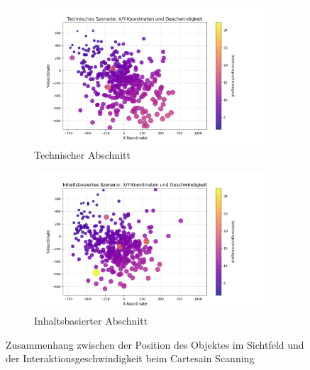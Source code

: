\begin{figure}
    \centering
    \begin{subfigure}{.5\textwidth}
        \centering
        \includegraphics[width=0.95\textwidth]{images/Results/bubbleplot-technisch.png}
        \caption{Technischer Abschnitt}
        \label{fig:bubbleKorrPosGeschwindigkeitTechnisch}
    \end{subfigure}%
    \begin{subfigure}{.5\textwidth}
        \centering
        \includegraphics[width=0.95\textwidth]{images/Results/bubbleplot-inhalt.png}
        \caption{Inhaltsbasierter Abschnitt}
        \label{fig:bubbleKorrPosGeschwindigkeitInhalt}
    \end{subfigure}
    \caption{Zusammenhang zwischen der Position des Objektes im Sichtfeld und der Interaktionsgeschwindigkeit beim Cartesain Scanning}
    \label{fig:bubbleKorrPosGeschwindigkeit}
\end{figure}

